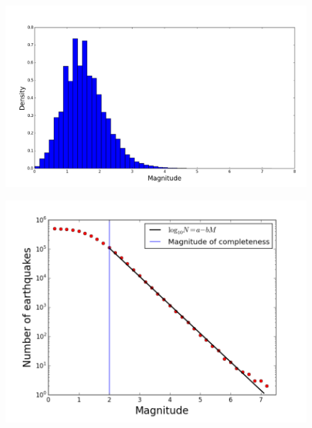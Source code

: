 \documentclass{beamer}
\begin{document}
	\begin{frame}
		\begin{figure}
			\centering
			\includegraphics[width=0.95\linewidth]{erdbeben2}
			\label{fig:earthquake2}
		\end{figure}
	\end{frame}
	
	\begin{frame}
		\begin{figure}
			\centering
			\includegraphics[width=0.95\linewidth]{erdbeben3}
			\label{fig:earthquake3}
		\end{figure}
	\end{frame}
	
	
\end{document}
